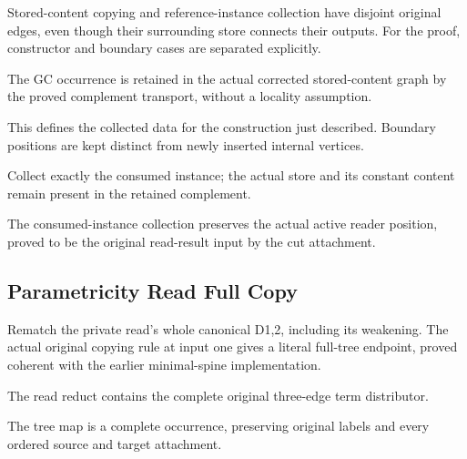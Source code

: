 Stored-content copying and reference-instance collection have disjoint original edges, even though their surrounding store connects their outputs.
For the proof, constructor and boundary cases are separated explicitly.
\par{}

The GC occurrence is retained in the actual corrected stored-content graph by the proved complement transport, without a locality assumption.
\par{}

This defines the collected data for the construction just described. Boundary positions are kept distinct from newly inserted internal vertices.
\par{}

Collect exactly the consumed instance; the actual store and its constant content remain present in the retained complement.
\par{}

The consumed-instance collection preserves the actual active reader position, proved to be the original read-result input by the cut attachment.
\par{}

\subsection{Parametricity Read Full Copy}
Rematch the private read's whole canonical D1,2, including its weakening. The actual original copying rule at input one gives a literal full-tree endpoint, proved coherent with the earlier minimal-spine implementation.

The read reduct contains the complete original three-edge term distributor.
\par{}

The tree map is a complete occurrence, preserving original labels and every ordered source and target attachment.
\par{}

